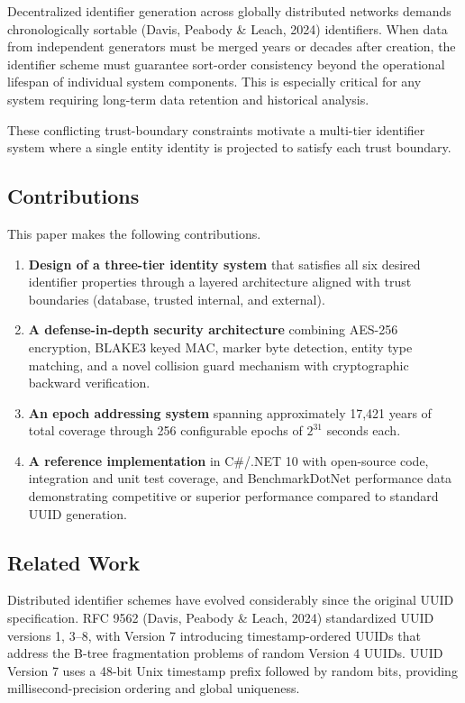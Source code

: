 \documentclass[fleqn,10pt]{wlpeerj}
\providecommand{\tightlist}{%
  \setlength{\itemsep}{0pt}\setlength{\parskip}{0pt}}
\begin{document}
Decentralized identifier generation across globally distributed networks
demands chronologically sortable (Davis, Peabody \& Leach, 2024)
identifiers. When data from independent generators must be merged years
or decades after creation, the identifier scheme must guarantee
sort-order consistency beyond the operational lifespan of individual
system components. This is especially critical for any system requiring
long-term data retention and historical analysis.

These conflicting trust-boundary constraints motivate a multi-tier
identifier system where a single entity identity is projected to satisfy
each trust boundary.

\subsection{Contributions}\label{contributions}

This paper makes the following contributions.

\begin{enumerate}
\def\labelenumi{\arabic{enumi}.}
\tightlist
\item
  \textbf{Design of a three-tier identity system} that satisfies all six
  desired identifier properties through a layered architecture aligned
  with trust boundaries (database, trusted internal, and external).
\item
  \textbf{A defense-in-depth security architecture} combining AES-256
  encryption, BLAKE3 keyed MAC, marker byte detection, entity type
  matching, and a novel collision guard mechanism with cryptographic
  backward verification.
\item
  \textbf{An epoch addressing system} spanning approximately 17,421
  years of total coverage through 256 configurable epochs of \(2^{31}\)
  seconds each.
\item
  \textbf{A reference implementation} in C\#/.NET 10 with open-source
  code, integration and unit test coverage, and BenchmarkDotNet
  performance data demonstrating competitive or superior performance
  compared to standard UUID generation.
\end{enumerate}

\newpage

\subsection{Related Work}\label{related-work}

Distributed identifier schemes have evolved considerably since the
original UUID specification. RFC 9562 (Davis, Peabody \& Leach, 2024)
standardized UUID versions 1, 3--8, with Version 7 introducing
timestamp-ordered UUIDs that address the B-tree fragmentation problems
of random Version 4 UUIDs. UUID Version 7 uses a 48-bit Unix timestamp
prefix followed by random bits, providing millisecond-precision ordering
and global uniqueness.
\end{document}

